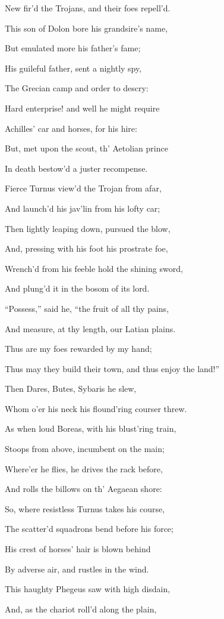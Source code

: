 New fir’d the Trojans, and their foes repell’d.

This son of Dolon bore his grandsire’s name,

But emulated more his father’s fame;

His guileful father, sent a nightly spy,

The Grecian camp and order to descry:

Hard enterprise! and well he might require

Achilles’ car and horses, for his hire:

But, met upon the scout, th’ Aetolian prince

In death bestow’d a juster recompense.

Fierce Turnus view’d the Trojan from afar,

And launch’d his jav’lin from his lofty car;

Then lightly leaping down, pursued the blow,

And, pressing with his foot his prostrate foe,

Wrench’d from his feeble hold the shining sword,

And plung’d it in the bosom of its lord.

“Possess,” said he, “the fruit of all thy pains,

And measure, at thy length, our Latian plains.

Thus are my foes rewarded by my hand;

Thus may they build their town, and thus enjoy the land!”

Then Dares, Butes, Sybaris he slew,

Whom o’er his neck his flound’ring courser threw.

As when loud Boreas, with his blust’ring train,

Stoops from above, incumbent on the main;

Where’er he flies, he drives the rack before,

And rolls the billows on th’ Aegaean shore:

So, where resistless Turnus takes his course,

The scatter’d squadrons bend before his force;

His crest of horses’ hair is blown behind

By adverse air, and rustles in the wind.

This haughty Phegeus saw with high disdain,

And, as the chariot roll’d along the plain,

